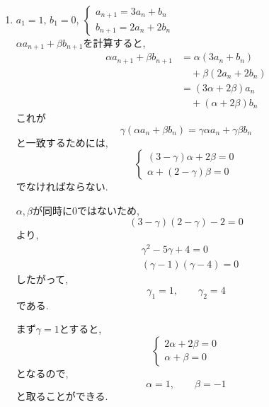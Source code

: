 \begin{enumerate}[label=(\arabic*),parsep=3pt,format=\bookitemlink{example-system-1}{solution}{problem}]
\begin{enumerate}
                  また,\((1)-(2)\)をすると,
                  \[
                    2b_n=2\cdot4^{n-1}
                  \]
                  なので,
                  \[
                    b_n=4^{n-1}
                  \]
          \end{enumerate}
    \item $\displaystyle a_1=1,\,b_1=0,\ \begin{cases}a_{n+1}=3a_n+b_n\\ b_{n+1}=2a_n+2b_n\end{cases}$\\
          $\alpha a_{n+1}+\beta b_{n+1}$を計算すると,
          \begin{align*}
            \alpha a_{n+1}+\beta b_{n+1}
              &=\alpha(3a_n+b_n)\\
              &\quad +\beta(2a_n+2b_n)\\
              &=(3\alpha+2\beta)a_n\\
              &\quad +(\alpha+2\beta)b_n
          \end{align*}
          これが
          \[
            \gamma(\alpha a_n+\beta b_n)
            =\gamma\alpha a_n+\gamma\beta b_n
          \]
          と一致するためには,
          \[
          \begin{cases}
            (3-\gamma)\alpha+2\beta=0\\
            \alpha+(2-\gamma)\beta=0
          \end{cases}
          \]
          でなければならない.

          $\alpha,\beta$が同時に$0$ではないため,
          \[
            (3-\gamma)(2-\gamma)-2=0
          \]
          より,
          \begin{align*}
            &\gamma^2-5\gamma+4=0\\
            &(\gamma-1)(\gamma-4)=0
          \end{align*}
          したがって,
          \[
            \gamma_1=1,\qquad\gamma_2=4
          \]
          である.

          まず$\gamma=1$とすると,
          \[
          \begin{cases}
            2\alpha+2\beta=0\\
            \alpha+\beta=0
          \end{cases}
          \]
          となるので,
          \[
            \alpha=1,\qquad\beta=-1
          \]
          と取ることができる.


\end{enumerate}
